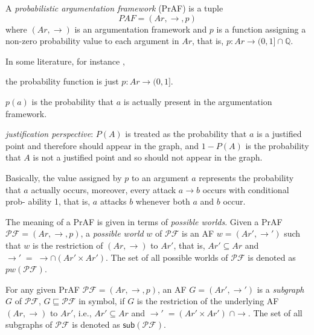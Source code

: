 \begin{df}[PrAFs]
    A \textit{probabilistic argumentation framework} (PrAF) is a tuple 
    \[
        PAF = (Ar,\to,p)
    \]
    where $(Ar,\to)$ is an argumentation framework and
    $p$ is a function assigning a non-zero probability value to each argument in $Ar$,
    that is,
    $p \colon Ar \to (0,1] \cap \mathbb{Q}$. 
\end{df}



\begin{remark}
    In some literature, 
    for instance ,

    
    the probability function is just $p \colon Ar \to (0,1]$.
\end{remark}



$p(a)$ is the probability that $a$ is actually present in the argumentation framework.




\vspace{1.5em}
\textit{justification perspective}:
$P(A)$ is treated as the probability that $a$ is a justified point and therefore should appear in the graph, 
and $1-P(A)$ is the probability that $A$ is not a justified point and so should not appear in the graph.

\vspace{1.5em}



Basically, 
the value assigned by $p$ to an argument $a$ represents the probability that $a$ actually occurs, 
moreover, 
every attack $a \to b$ occurs with conditional prob- ability 1, 
that is, 
$a$ attacks $b$ whenever both $a$ and $b$ occur.



The meaning of a PrAF is given in terms of \textit{possible worlds}. 
Given a PrAF $\mathcal{PF}=(Ar,\to,p)$, 
a \textit{possible world} $w$ of $\mathcal{PF}$ is an AF $w=(Ar',\to')$ such that 
$w$ is the restriction of $(Ar,\to)$ to $Ar'$, 
that is, 
$Ar' \subseteq Ar$ and $\to' \;=\; \rightarrow \cap (Ar'\times Ar')$. 
% 
The set of all possible worlds of $\mathcal{PF}$ is denoted as $pw(\mathcal{PF})$.



\begin{df}[Subgraph]
\label{def: subgraph}
    For any given PrAF $\mathcal{PF}=(Ar,\to,p)$,     
    an AF $G = (Ar',\to')$ is a \textit{subgraph} $G$ of $\mathcal{PF}$,  $G \sqsubseteq \mathcal{PF}$ in symbol, 
    if $G$ is the restriction of the underlying AF $(Ar,\to)$ to $Ar'$, 
    i.e., 
    $Ar' \subseteq Ar$ and $\to' \;= (Ar'\times Ar')\; \cap \to$. 
    The set of all subgraphs of $\mathcal{PF}$ is denoted as $\mathsf{sub}(\mathcal{PF})$.
\end{df}


